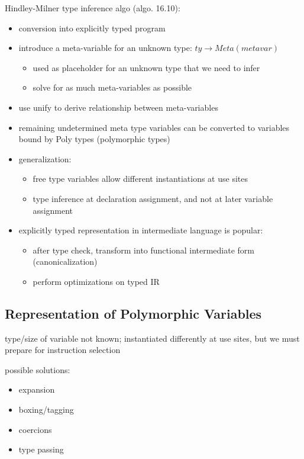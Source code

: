 \documentclass[8pt]{extarticle}
\begin{document}
\begin{multicols*}{2}
  Hindley-Milner type inference algo (algo. 16.10):
  \begin{itemize}
  \item conversion into explicitly typed program
  \item introduce a meta-variable for an unknown type: $ty \rightarrow Meta(metavar)$
    \begin{itemize}
    \item used as placeholder for an unknown type that we need to infer
    \item solve for as much meta-variables as possible
    \end{itemize}
  \item use unify to derive relationship between meta-variables
  \item remaining undetermined meta type variables can be converted to variables bound by Poly types (polymorphic types)
  \item generalization:
    \begin{itemize}
    \item free type variables allow different instantiations at use sites
    \item type inference at declaration assignment, and not at later variable assignment
    \end{itemize}
  \item explicitly typed representation in intermediate language is popular:
    \begin{itemize}
    \item after type check, transform into functional intermediate form (canonicalization)
    \item perform optimizations on typed IR
    \end{itemize}
  \end{itemize}

  \subsection{Representation of Polymorphic Variables}

  type/size of variable not known; instantiated differently at use sites, but we must prepare for instruction selection

  possible solutions:
  \begin{itemize}
  \item expansion
  \item boxing/tagging
  \item coercions
  \item type passing
  \end{itemize}


\end{multicols*}
\end{document}
